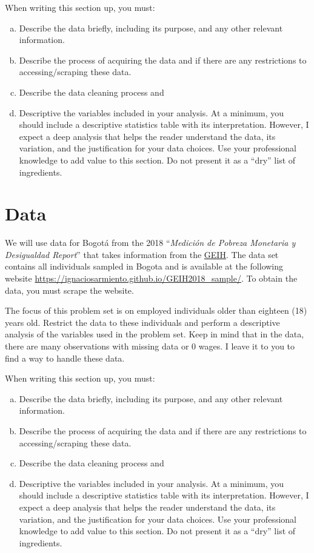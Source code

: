 \documentclass[12pt,a4paper,onecolumn]{article}
\begin{document}
When writing this section up, you must:
\begin{enumerate}[(a)]
  \item Describe the data briefly, including its purpose, and any other relevant information.
  \item Describe the process of acquiring the data and if there are any restrictions to accessing/scraping these data.
  \item Describe the data cleaning process and
  \item Descriptive the variables included in your analysis. At a minimum, you should include a descriptive statistics table with its interpretation. However, I expect a deep analysis that helps the reader understand the data, its variation, and the justification for your data choices. Use your professional knowledge to add value to this section. Do not present it as a ``dry'' list of ingredients.
\end{enumerate}

\section{Data}

We will use data for Bogotá from the 2018 ``\emph{Medición de Pobreza Monetaria y Desigualdad Report}'' that takes information from the \href{https://www.dane.gov.co/}{GEIH}. The data set contains all individuals sampled in Bogota and is available at the following website \href{https://ignaciosarmiento.github.io/GEIH2018_sample/}{https://ignaciosarmiento.github.io/GEIH2018\_sample/}. To obtain the data, you must scrape the website.

The focus of this problem set is on employed individuals older than eighteen (18) years old. Restrict the data to these individuals and perform a descriptive analysis of the variables used in the problem set. Keep in mind that in the data, there are many observations with missing data or 0 wages. I leave it to you to find a way to handle these data.

When writing this section up, you must:
\begin{enumerate}[(a)]
  \item Describe the data briefly, including its purpose, and any other relevant information.
  \item Describe the process of acquiring the data and if there are any restrictions to accessing/scraping these data.
  \item Describe the data cleaning process and
  \item Descriptive the variables included in your analysis. At a minimum, you should include a descriptive statistics table with its interpretation. However, I expect a deep analysis that helps the reader understand the data, its variation, and the justification for your data choices. Use your professional knowledge to add value to this section. Do not present it as a ``dry'' list of ingredients.
\end{enumerate}
\end{document}

